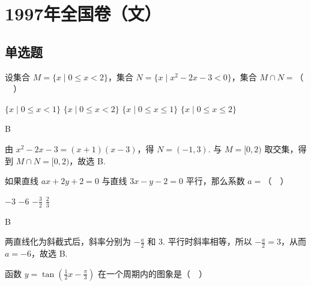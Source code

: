 \documentclass[UTF8,a4paper,oneside,11pt]{ctexbook}
\begin{document}
\mainmatter

\chapter{1997年全国卷（文）}
\section{单选题}

\begin{problem}
设集合 \(M = \{x \mid 0 \leqslant x < 2\}\)，集合 \(N = \{x \mid x^2 - 2x - 3 < 0\}\)，集合 \(M \cap N =\)（\(\quad\)）

\choices
    {\(\{x\mid 0\leqslant x < 1\}\)}
    {\(\{x\mid 0\leqslant x < 2\}\)}
    {\(\{x\mid 0\leqslant x\leqslant 1\}\)}
    {\(\{x\mid 0\leqslant x\leqslant 2\}\)}

\end{problem}

\begin{answer}
B
\end{answer}

\begin{solution}
由 \(x^{2}-2x-3=(x+1)(x-3)\)，得 \(N=(-1,3)\). 与 \(M=[0,2)\) 取交集，得到 \(M\cap N=[0,2)\)，故选 B.
\end{solution}

\begin{problem}
如果直线 \(ax + 2y + 2 = 0\) 与直线 \(3x - y - 2 = 0\) 平行，那么系数 \(a =\)（\(\quad\)）

\choices
    {\(-3\)}
    {\(-6\)}
    {\(-\frac{3}{2}\)}
    {\(\frac{2}{3} \)}

\end{problem}

\begin{answer}
B
\end{answer}

\begin{solution}
两直线化为斜截式后，斜率分别为 \(-\frac a2\) 和 \(3\).
平行时斜率相等，所以 \(-\frac{a}{2}=3\)，从而 \(a=-6\)，故选 B.
\end{solution}

\begin{problem}
函数 \(y = \tan \left(\frac{1}{2}x - \frac{\pi}{3}\right)\) 在一个周期内的图象是（\(\quad\)）

\choices
    {}
    {}
    {}
    {}

\end{problem}
\end{document}
